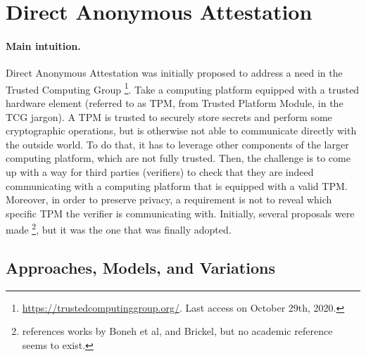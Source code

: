 \section{Direct Anonymous Attestation}
\label{sec:daa}



\paragraph{Main intuition.}
%
Direct Anonymous Attestation \cite{bcc04} was initially proposed to address a
need in the Trusted Computing Group
\footnote{\url{https://trustedcomputinggroup.org/}. Last access on October 29th,
  2020.}. Take a computing platform equipped with a trusted hardware element
(referred to as TPM, from Trusted Platform Module, in the TCG jargon). A TPM
is trusted to securely store secrets and perform some cryptographic operations,
but is otherwise not able to communicate directly with the outside world. To
do that, it has to leverage other components of the larger computing platform,
which are not fully trusted. Then, the challenge is to come up with a way for
third parties (verifiers) to check that they are indeed communicating with a
computing platform that is equipped with a valid TPM. Moreover, in order to
preserve privacy, a requirement is not to reveal which specific TPM the
verifier is communicating with. Initially, several proposals were made
\needcite\footnote{\cite{bcc04} references works by Boneh et al, and Brickel,
  but no academic reference seems to exist.}, but it was \cite{bcc04} the one
that was finally adopted.

\subsection{Approaches, Models, and Variations}
\label{ssec:daaapproach}

